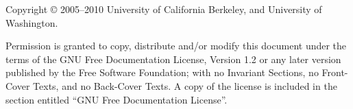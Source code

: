 
Copyright \copyright{} 2005--2010
University of California Berkeley, and
University of Washington.  

Permission is granted to copy, distribute and/or
modify this document under the terms of the GNU Free Documentation License,
Version 1.2 or any later version published by the Free Software Foundation;
with no Invariant Sections, no Front-Cover Texts, and no Back-Cover Texts.
A copy of the license is included in the section entitled ``GNU Free
Documentation License''.

